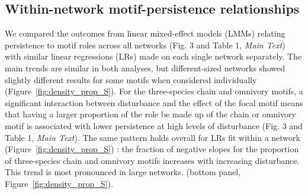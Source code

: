 \documentclass[12pt]{article}
\begin{document}
\begin{spacing}{2.0}
\clearpage

\section{Within-network motif-persistence relationships}

    We compared the outcomes from linear mixed-effect models (LMMs) relating persistence to motif roles across all networks (Fig. 3 and Table 1, \emph{Main Text}) with similar linear regressions (LRs) made on each single network separately.
    The main trends are similar in both analyses, but different-sized networks showed slightly different results for some motifs when considered individually (Figure~\ref{fig:density_prop_S}).
    For the three-species chain and omnivory motifs, a significant interaction between disturbance and the effect of the focal motif means that having a larger proportion of the role be made up of the chain or omnivory motif is associated with lower persistence at high levels of disturbance (Fig. 3 and Table 1, \emph{Main Text}). 
    The same pattern holds overall for LRs fit within a network  (Figure~\ref{fig:density_prop_S})
    : the fraction of negative slopes for the proportion of three-species chain and omnivory motifs increases with increasing disturbance. 
    This trend is most pronounced in large networks. (bottom panel, Figure~\ref{fig:density_prop_S}). 
    

\end{spacing}
\end{document}
